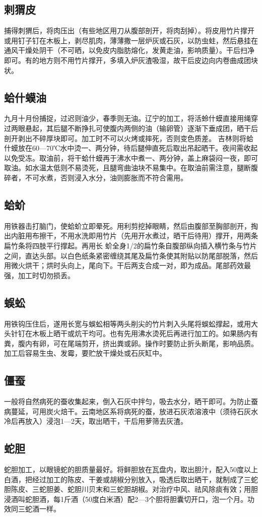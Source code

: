 \documentclass{ctexbook}
\begin{document}
\subsection{剌猬皮}
捕得刺猬后，将肉压出（有些地区用刀从腹部剖开，将肉刮掉）。将皮用竹片撑开或用钉子钉在木板上，剥尽肌肉，薄薄撒一层炉灰或石灰，以防虫蛀，然后悬挂在通风干燥处阴干（不可晒，以免皮内脂肪熔化，发黄走油，影响质量）。干后扫净即可。有的地方则不用竹片撑开，多填入炉灰渣吸湿，故干后皮边向内卷曲成团块状。
\subsection{蛤什蟆油}
九月十月份捕捉，过迟则油少，春季则无油。辽宁的加工，将活蛉什蟆直接用绳穿过两眼悬起，其后腿不断挣扎可使腹内两侧的油（输卵管）逐渐下垂成团，晒干后剖开剥出不碎厚块即可。加工时不可以火烤或摔死，否则变色质差。
吉林则将蛤什蟆放在60—70℃水中烫一、两分钟，待后腿伸直死后取出吊起晒干。夜间需收起以免受冻。取油前，将干蛤什蟆再于沸水中煮一、两分钟，盖上麻袋闷一夜，即可取油。如水温太低则不易烫死，且腿弯曲油块不易集中。在取油前需注意，腿断腹碎者，不可水煮，否则浸入水分，油则膨胀而不符合需用。
\subsection{蛤蚧}
用铁器击打脑门，使蛤蚧立即晕死。用利剪挖掉眼睛，然后由腹部至胸部剖开，掏出内脏用布擦干，不用水洗即用竹片（先用开水煮过，晒干后待用）撑开，用两条扁竹条将四肢平行撑起。再用长
蚧全身1/2的扁竹条自腹部纵向插入横竹条与竹片之间，直达头部。以白色纸条紧密缠绕其尾及扁竹条使其附贴以防尾部脱落，然后用微火烘干；烘时头向上，尾向下。干后两支合成一对，即为成品。尾部药效最强，加工时切勿损丢。
\subsection{蜈蚣}
用铁钩压住后，遂用长宽与蜈蚣相等两头削尖的竹片刺入头尾将蜈蚣撑起，或用大头针钉在木板上晒干或炕干均可。也有先用沸水烫死后再进行加工的。如果肠内有粪，腹内有卵，可在尾端剪开，挤出粪或卵。操作时要防止折头断尾，影响品质。加工后容易生虫、发霉，要贮放干燥处或石灰缸中。
\subsection{僵蚕}
一般将自然病死的蚕收集起来，倒入石灰中拌匀，吸去水分，晒干即可。为防止蚕病蔓延，可用炭火焙干。云南地区系将病死的蚕，放进石灰浓溶液中（须待石灰水冷后再放入）浸泡1—2天，取出晒干，干后用萝筛去灰渣。
\subsection{蛇胆}
蛇胆加工，以眼镜蛇的胆质量最好。将鲜胆放在瓦盘内，取出胆汁，配入50度以上白酒，把经过加工的陈皮、干姜或胡椒分别放入，吸透后取出晒干，就制成了三蛇胆陈皮、三蛇胆姜、蛇胆川贝末和三蛇胆胡椒。对治疗中风、祛风除痰有效；用胆浸酒叫蛇胆酒，每1斤酒（50度白米酒）配2—3个胆将胆囊切开口，泡一个月。功效同三蛇酒一样。
\end{document}
